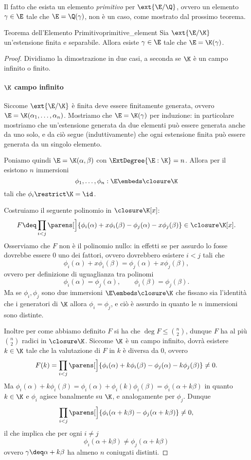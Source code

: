 Il fatto che esista un elemento \emph{primitivo} per $\ext{\E / \Q}$, ovvero un elemento $\gamma \in \E$ tale che $\E = \Q(\gamma)$, non è un caso, come mostrato dal prossimo teorema.

\begin{theorem}
    {Teorema dell'Elemento Primitivo}{primitive_element}
    Sia $\ext{\E / \K}$ un'estensione finita e separabile. Allora esiste $\gamma \in \E$ tale che $\E = \K(\gamma)$. 
\end{theorem}
\begin{proof}
    Dividiamo la dimostrazione in due casi, a seconda se $\K$ è un campo infinito o finito.
    \paragraph{$\K$ campo infinito} Siccome $\ext{\E / \K}$ è finita deve essere finitamente generata, ovvero $\E = \K(\alpha_1, \dots, \alpha_n)$. Mostriamo che $\E = \K(\gamma)$ per induzione: in particolare mostriamo che un'estensione generata da due elementi può essere generata anche da uno solo, e da ciò segue (induttivamente) che ogni estensione finita può essere generata da un singolo elemento.

    Poniamo quindi $\E = \K(\alpha, \beta)$ con $\ExtDegree{\E : \K} = n$. Allora per il  esistono $n$ immersioni \[
        \phi_1, \dots, \phi_n : \E \embeds \closure\K
    \] tali che $\phi_i\restrict\K = \id$.
    
    Costruiamo il seguente polinomio in $\closure\K[x]$: \[
        F \deq \prod_{i < j} \parens[\Big]{\phi_i(\alpha) + x\phi_i(\beta) - \phi_j(\alpha) - x\phi_j(\beta)} \in \closure\K[x].
    \] Osserviamo che $F$ non è il polinomio nullo: in effetti se per assurdo lo fosse dovrebbe essere $0$ uno dei fattori, ovvero dovrebbero esistere $i < j$ tali che \[
        \phi_i(\alpha) + x\phi_i(\beta) = \phi_j(\alpha) + x\phi_j(\beta),
    \] ovvero per definizione di uguaglianza tra polinomi \[
        \phi_i(\alpha) = \phi_j(\alpha), \qquad \phi_i(\beta) = \phi_j(\beta).
    \] Ma se $\phi_i, \phi_j$ sono due immersioni $\E \embeds \closure\K$ che fissano sia l'identità che i generatori di $\K$ allora $\phi_i = \phi_j$, e ciò è assurdo in quanto le $n$ immersioni sono distinte.

    Inoltre per come abbiamo definito $F$ si ha che $\deg F \leq \binom{n}{2}$, dunque $F$ ha al più $\binom{n}{2}$ radici in $\closure\K$. Siccome $\K$ è un campo infinito, dovrà esistere $k \in \K$ tale che la valutazione di $F$ in $k$ è diversa da $0$, ovvero \[
        F(k) = \prod_{i < j} \parens[\Big]{\phi_i(\alpha) + k\phi_i(\beta) - \phi_j(\alpha) - k\phi_j(\beta)} \neq 0.
    \] Ma $\phi_i(\alpha) + k\phi_i(\beta) = \phi_i(\alpha) + \phi_i(k)\phi_i(\beta) = \phi_i(\alpha + k\beta)$ in quanto $k \in \K$ e $\phi_i$ agisce banalmente su $\K$, e analogamente per $\phi_j$. Dunque \[
        \prod_{i < j} \parens[\Big]{\phi_i(\alpha + k\beta) - \phi_j(\alpha + k\beta)} \neq 0,
    \] il che implica che per ogni $i \neq j$ \[
        \phi_i(\alpha + k\beta) \neq \phi_j(\alpha + k\beta)
    \] ovvero $\gamma \deq \alpha+k\beta$ ha almeno $n$ coniugati distinti.


\end{proof}
